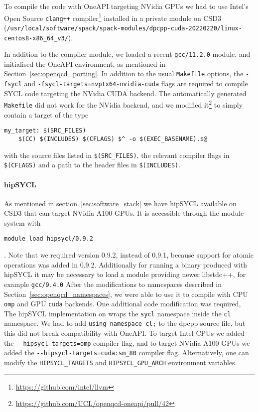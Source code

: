 \documentclass[../main]{subfiles}
\begin{document}
To compile the code with OneAPI targeting NVidia GPUs we had to use Intel's Open Source \verb #clang++# compiler\footnote{\url{https://github.com/intel/llvm}} installed in a private module on CSD3 (\lstinline[basicstyle=\normalsize\ttfamily,breaklines=true,
	breakatwhitespace=false,language=sh]!/usr/local/software/spack/spack-modules/dpcpp-cuda-20220220/linux-centos8-x86_64_v3/!).

In addition to the compiler module, we loaded a recent \verb #gcc/11.2.0# module, and initialised the OneAPI environment, as mentioned in Section~\ref{sec:openqcd_porting}.
In addition to the usual \texttt{Makefile} options, the \verb #-fsycl# and \verb #-fsycl-targets=nvptx64-nvidia-cuda# flags are required to compile SYCL code targeting the NVidia CUDA backend.
The automatically generated \texttt{Makefile} did not work for the NVidia backend, and we  modified it\footnote{\url{https://github.com/UCL/openqcd-oneapi/pull/42}} to simply contain a target of the type
\begin{verbatim}
my_target: $(SRC_FILES)
	$(CC) $(INCLUDES) $(CFLAGS) $^ -o $(EXEC_BASENAME).$@
\end{verbatim}
with the source files listed in \verb #$(SRC_FILES)#, the relevant compiler flags in \verb #$(CFLAGS)# and a path to the header files in \verb #$(INCLUDES)#.

\paragraph{hipSYCL}

As mentioned in section~\ref{sec:software_stack} we have hipSYCL available on CSD3 that can target NVidia A100 GPUs.
It is accessible through the module system with
\begin{verbatim}
module load hipsycl/0.9.2
\end{verbatim}.
Note that we required version 0.9.2, instead of 0.9.1, because support for atomic operations was added in 0.9.2.
Additionally for running a binary produced with hipSYCL it may be necessary to load a module providing newer libstdc++, for example \verb #gcc/9.4.0#
After the modifications to namespaces described in Section~\ref{sec:openqcd_namespaces}, we were able to use it to compile with CPU \texttt{omp} and GPU \texttt{cuda} backends.
One additional code modification was required, The hipSYCL implementation on wraps the \texttt{sycl} namespace inside the \texttt{cl} namespace.
We had to add \verb !using namespace cl;! to the dpcpp source file, but this did not break compatibility with OneAPI.
To target Intel CPUs we added the \verb !--hipsycl-targets=omp! compiler flag, and to target NVidia A100 GPUs we added the \verb !--hipsycl-targets=cuda:sm_80! compiler flag.
Alternatively, one can modify the \verb !HIPSYCL_TARGETS! and \verb !HIPSYCL_GPU_ARCH! environment variables.
\end{document}

